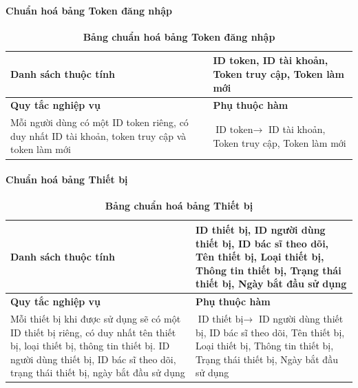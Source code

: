 \paragraph{Chuẩn hoá bảng Token đăng nhập}
\mbox{}
\begin{table}[H]
  \caption{\bfseries \fontsize{12pt}{0pt}\selectfont Bảng chuẩn hoá bảng Token đăng nhập}
  \centering
  \begin{tabularx}{0.9\textwidth}{|X|X|}
    \hline
    \textbf{Danh sách thuộc tính} & ID token, ID tài khoản, Token truy cập, Token làm mới \\
    \hline
    \textbf{Quy tắc nghiệp vụ} & \textbf{Phụ thuộc hàm} \\
    \hline
    Mỗi người dùng có một ID token riêng, có duy nhất ID tài khoản, token truy cập và token làm mới 
    & \parbox[t]{\linewidth}{$\text{ID token} \rightarrow$ ID tài khoản, Token truy cập, Token làm mới} \\
    \hline
     \\
     \\
    \hline
  \end{tabularx}
\end{table}

\paragraph{Chuẩn hoá bảng Thiết bị}
\mbox{}
\begin{table}[H]
  \caption{\bfseries \fontsize{12pt}{0pt}\selectfont Bảng chuẩn hoá bảng Thiết bị}
  \centering
  \begin{tabularx}{0.9\textwidth}{|X|X|}
    \hline
    \textbf{Danh sách thuộc tính} & ID thiết bị, ID người dùng thiết bị, ID bác sĩ theo dõi, Tên thiết bị, 
    Loại thiết bị, Thông tin thiết bị, Trạng thái thiết bị, Ngày bắt đầu sử dụng \\
    \hline
    \textbf{Quy tắc nghiệp vụ} & \textbf{Phụ thuộc hàm} \\
    \hline
    Mỗi thiết bị khi được sử dụng sẽ có một ID thiết bị riêng, có duy nhất tên thiết bị, loại thiết bị, thông tin thiết bị.
    ID người dùng thiết bị, ID bác sĩ theo dõi, trạng thái thiết bị, ngày bắt đầu sử dụng
    & \parbox[t]{\linewidth}{$\text{ID thiết bị} \rightarrow$ ID người dùng thiết bị, ID bác sĩ theo dõi, Tên thiết bị, 
    Loại thiết bị, Thông tin thiết bị, Trạng thái thiết bị, Ngày bắt đầu sử dụng} \\
    \hline
     \\
     \\
    \hline
  \end{tabularx}
\end{table}

